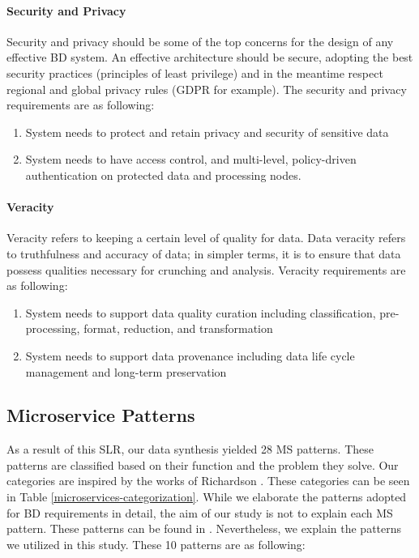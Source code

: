 \documentclass{bmcart}
\begin{document}
\paragraph{Security and Privacy}

Security and privacy should be some of the top concerns for the design of any effective BD system. An effective architecture should be secure, adopting the best security practices (principles of least privilege) and in the meantime respect regional and global privacy rules (GDPR for example). The security and privacy requirements are as following:

\begin{enumerate}[label=\textbf{SaP-\arabic*}]
    \item System needs to protect and retain privacy and security of sensitive data
    \item System needs to have access control, and multi-level, policy-driven authentication on protected data and processing nodes.
\end{enumerate}

\paragraph{Veracity}

Veracity refers to keeping a certain level of quality for data. Data veracity refers to truthfulness and accuracy of data; in simpler terms, it is to ensure that data possess qualities necessary for crunching and analysis. Veracity requirements are as following: 

\begin{enumerate}[label=\textbf{Ver-\arabic*}]
    \item System needs to support data quality curation including classification, pre-processing, format, reduction, and transformation
    \item System needs to support data provenance including data life cycle management and long-term preservation
\end{enumerate}



\subsection{Microservice Patterns}



As a result of this SLR, our data synthesis yielded 28 MS patterns. These patterns are classified based on their function and the problem they solve. Our categories are inspired by the works of Richardson \cite{Richardson.2022}. These categories can be seen in Table \ref{microservices-categorization}. While we elaborate the patterns adopted for BD requirements in detail, the aim of our study is not to explain each MS pattern. These patterns can be found in \cite{richardson2018microservices}. Nevertheless, we explain the patterns we utilized in this study. These 10 patterns are as following: 
\end{document}

